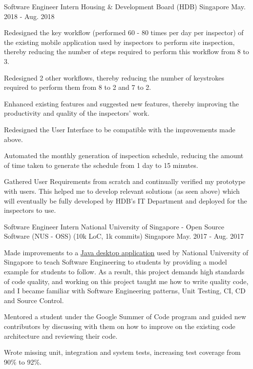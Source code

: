 \begin{cventries}
  \cventry
    {Software Engineer Intern} %
    {Housing \& Development Board (HDB)} %
    {Singapore} %
    {May. 2018 - Aug. 2018} %
    {
      \begin{cvitems} %
        \item {Redesigned the key workflow (performed 60 - 80 times per day per inspector) of the existing mobile application used by inspectors to perform site inspection, thereby reducing the number of steps required to perform this workflow from 8 to 3.}
        \item {Redesigned 2 other workflows, thereby reducing the number of keystrokes required to perform them from 8 to 2 and 7 to 2.}
        \item {Enhanced existing features and suggested new features, thereby improving the productivity and quality of the inspectors' work.}
        \item {Redesigned the User Interface to be compatible with the improvements made above.}
        \item {Automated the monthly generation of inspection schedule, reducing the amount of time taken to generate the schedule from 1 day to 15 minutes.}
        \item {Gathered User Requirements from scratch and continually verified my prototype with users. This helped me to develop relevant solutions (as seen above) which will eventually be fully developed by HDB's IT Department and deployed for the inspectors to use.}
      \end{cvitems}
    }

  \cventry
    {Software Engineer Intern} %
    {National University of Singapore - Open Source Software (NUS - OSS) (10k LoC, 1k commits)} %
    {Singapore} %
    {May. 2017 - Aug. 2017} %
    {
      \begin{cvitems} %
        \item {Made improvements to a \href{https://github.com/issues?utf8=\%E2\%9C\%93&q=repo\%3Ase-edu\%2Faddressbook-level4+involves\%3AZhiyuan-Amos}{Java desktop application} used by National University of Singapore to teach Software Engineering to students by providing a model example for students to follow. As a result, this project demands high standards of code quality, and working on this project taught me how to write quality code, and I became familiar with Software Engineering patterns, Unit Testing, CI, CD and Source Control.}
        \item {Mentored a student under the Google Summer of Code program and guided new contributors by discussing with them on how to improve on the existing code architecture and reviewing their code.}
        \item {Wrote missing unit, integration and system tests, increasing test coverage from 90\% to 92\%.}
      \end{cvitems}
    }


\end{cventries}
